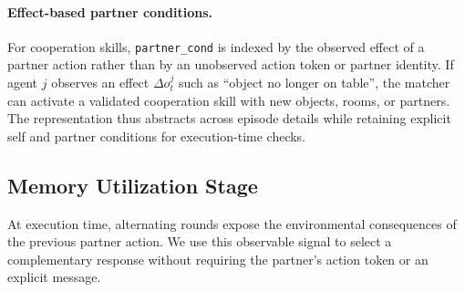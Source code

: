 \documentclass{article}
\theoremstyle{plain}
\theoremstyle{definition}
\theoremstyle{remark}
\begin{document}
\paragraph{Effect-based partner conditions.}\label{subsec:effect_inference}
For cooperation skills, \texttt{partner\_cond} is indexed by the observed effect of a partner action rather than by an unobserved action token or partner identity. If agent $j$ observes an effect $\Delta o_t^j$ such as ``object no longer on table'', the matcher can activate a validated cooperation skill with new objects, rooms, or partners. The representation thus abstracts across episode details while retaining explicit self and partner conditions for execution-time checks.
 
\subsection{Memory Utilization Stage}
\label{subsec:utilization}
\label{subsec:memory_utilization}
 
At execution time, alternating rounds expose the environmental consequences of the previous partner action. We use this observable signal to select a complementary response without requiring the partner's action token or an explicit message.
 
\end{document}
